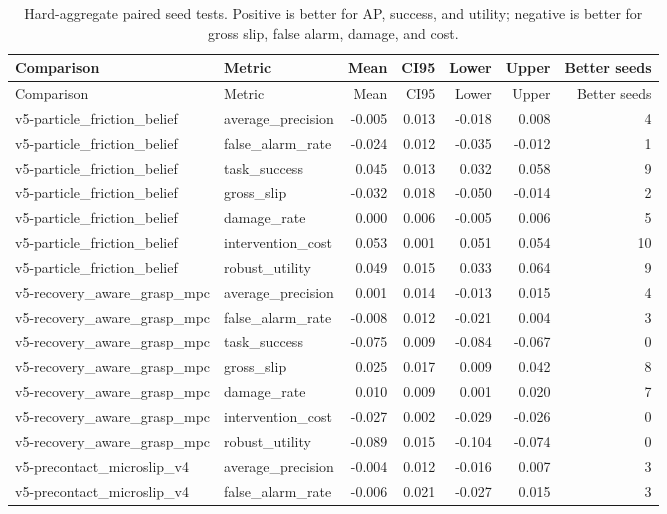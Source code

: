 \documentclass{article}
\begin{document}
\begin{longtable}{@{}llrrrrr@{}}
\caption{Hard-aggregate paired seed tests. Positive is better for AP, success, and utility; negative is better for gross slip, false alarm, damage, and cost.}\\
\toprule
Comparison & Metric & Mean & CI95 & Lower & Upper & Better seeds \\
\midrule
\endfirsthead
\toprule
Comparison & Metric & Mean & CI95 & Lower & Upper & Better seeds \\
\midrule
\endhead
v5-particle\_friction\_belief & average\_precision & -0.005 & 0.013 & -0.018 & 0.008 & 4 \\
v5-particle\_friction\_belief & false\_alarm\_rate & -0.024 & 0.012 & -0.035 & -0.012 & 1 \\
v5-particle\_friction\_belief & task\_success & 0.045 & 0.013 & 0.032 & 0.058 & 9 \\
v5-particle\_friction\_belief & gross\_slip & -0.032 & 0.018 & -0.050 & -0.014 & 2 \\
v5-particle\_friction\_belief & damage\_rate & 0.000 & 0.006 & -0.005 & 0.006 & 5 \\
v5-particle\_friction\_belief & intervention\_cost & 0.053 & 0.001 & 0.051 & 0.054 & 10 \\
v5-particle\_friction\_belief & robust\_utility & 0.049 & 0.015 & 0.033 & 0.064 & 9 \\
v5-recovery\_aware\_grasp\_mpc & average\_precision & 0.001 & 0.014 & -0.013 & 0.015 & 4 \\
v5-recovery\_aware\_grasp\_mpc & false\_alarm\_rate & -0.008 & 0.012 & -0.021 & 0.004 & 3 \\
v5-recovery\_aware\_grasp\_mpc & task\_success & -0.075 & 0.009 & -0.084 & -0.067 & 0 \\
v5-recovery\_aware\_grasp\_mpc & gross\_slip & 0.025 & 0.017 & 0.009 & 0.042 & 8 \\
v5-recovery\_aware\_grasp\_mpc & damage\_rate & 0.010 & 0.009 & 0.001 & 0.020 & 7 \\
v5-recovery\_aware\_grasp\_mpc & intervention\_cost & -0.027 & 0.002 & -0.029 & -0.026 & 0 \\
v5-recovery\_aware\_grasp\_mpc & robust\_utility & -0.089 & 0.015 & -0.104 & -0.074 & 0 \\
v5-precontact\_microslip\_v4 & average\_precision & -0.004 & 0.012 & -0.016 & 0.007 & 3 \\
v5-precontact\_microslip\_v4 & false\_alarm\_rate & -0.006 & 0.021 & -0.027 & 0.015 & 3 \\

\end{longtable}
\end{document}
